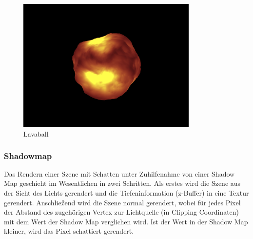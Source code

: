 \begin{figure}[H]
    \centering
    \includegraphics[width=0.8\textwidth]{images/lava.png}
    \caption{Lavaball}
    \label{fig:reflection-phong-specular-model}
\end{figure}

\subsubsection{Shadowmap}
Das Rendern einer Szene mit Schatten unter Zuhilfenahme von einer Shadow Map geschieht im Wesentlichen in zwei Schritten. Als erstes wird die Szene aus der Sicht des Lichts gerendert und die Tiefeninformation (z-Buffer) in eine Textur gerendert. Anschließend wird die Szene normal gerendert, wobei für jedes Pixel  der Abstand des zugehörigen Vertex zur Lichtquelle (in Clipping Coordinaten) mit dem Wert der Shadow Map verglichen wird. Ist der Wert in der Shadow Map kleiner, wird  das Pixel schattiert gerendert.

\begin{figure}[H]\centering
    \hspace*{0.1\textwidth}
    \vspace*{1em}
\end{figure}



